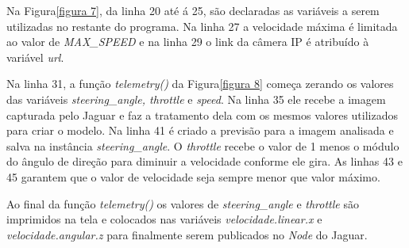Na Figura\ref{figura 7}, da linha 20 até á 25, são declaradas as variáveis a serem utilizadas no restante do programa. Na linha 27 a velocidade máxima é limitada ao valor de \textit{MAX\_SPEED} e na linha 29 o link da câmera IP é atribuído à variável \textit{url}.
\begin{figure}[H]
	\centering
\end{figure}

Na linha 31, a função \textit{telemetry()} da Figura\ref{figura 8} começa zerando os valores das variáveis \textit{steering\_angle, throttle} e \textit{speed}. Na linha 35 ele recebe a imagem capturada pelo Jaguar e faz a tratamento dela com os mesmos valores utilizados para criar o modelo. Na linha 41 é criado a previsão para a imagem analisada e salva na instância \textit{steering\_angle}. O \textit{throttle} recebe o valor de 1 menos o módulo do ângulo de direção para diminuir a velocidade conforme ele gira. As linhas 43 e 45 garantem que o valor de velocidade seja sempre menor que valor máximo.

Ao final da função \textit{telemetry()} os valores de \textit{steering\_angle} e \textit{throttle} são imprimidos na tela e colocados nas variáveis \textit{velocidade.linear.x} e \textit{velocidade.angular.z} para finalmente serem publicados no  \textit{Node} do Jaguar.

\begin{figure}[H]
	\centering
\end{figure}

